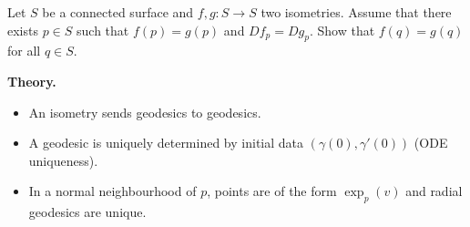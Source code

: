 \begin{problem}
\label{prob:cp-vii-0080}
Let $S$ be a connected surface and $f,g:S\to S$ two isometries.
Assume that there exists $p\in S$ such that $f(p)=g(p)$ and $Df_p=Dg_p$.
Show that $f(q)=g(q)$ for all $q\in S$.

\medskip
\textbf{Theory.}
\begin{itemize}
	\item An isometry sends geodesics to geodesics.
	\item A geodesic is uniquely determined by initial data $(\gamma(0),\gamma'(0))$ (ODE uniqueness).
	\item In a normal neighbourhood of $p$, points are of the form $\exp_p(v)$ and radial geodesics are unique.
\end{itemize}

\medskip
\end{problem}

